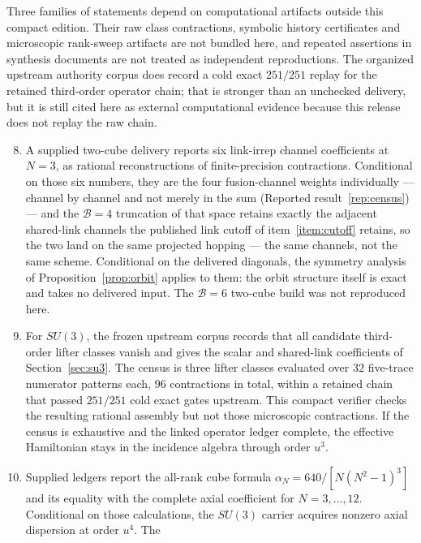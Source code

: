 \documentclass[11pt]{article}
\theoremstyle{plain}
\theoremstyle{definition}
\theoremstyle{remark}
\begin{document}
Three families of statements depend on computational artifacts outside this
compact edition. Their raw class contractions, symbolic history certificates
and microscopic rank-sweep artifacts are not bundled here, and repeated
assertions in synthesis documents are not treated as independent
reproductions. The organized upstream authority corpus does record a cold exact
$251/251$ replay for the retained third-order operator chain; that is stronger
than an unchecked delivery, but it is still cited here as external
computational evidence because this release does not replay the raw chain.

\begin{enumerate}\setcounter{enumi}{7}\itemsep2pt
\item A supplied two-cube delivery reports six link-irrep channel
  coefficients at $N=3$, as rational reconstructions of finite-precision
  contractions. Conditional on those six numbers, they are the four
  fusion-channel weights individually --- channel by channel and not merely in
  the sum (Reported result~\ref{rep:census}) --- and the $\mathcal B=4$ truncation of
  that space retains exactly the adjacent shared-link channels the published
  link cutoff of item~\ref{item:cutoff} retains, so the two land on the same
  projected hopping --- the same channels, not the same scheme. Conditional on the delivered diagonals, the symmetry
  analysis of Proposition~\ref{prop:orbit} applies to them: the orbit structure
  itself is exact and takes no delivered input.
  The $\mathcal B=6$ two-cube build was not reproduced here.
\item\label{item:domino} For $SU(3)$, the frozen upstream corpus records that
  all candidate third-order lifter classes vanish and gives the scalar and
  shared-link coefficients of Section~\ref{sec:su3}. The census is three
  lifter classes evaluated over $32$ five-trace numerator patterns each, $96$
  contractions in total, within a retained chain that passed $251/251$ cold
  exact gates upstream. This compact verifier checks the resulting rational
  assembly but not those microscopic contractions. If the census is exhaustive
  and the linked operator ledger complete, the effective Hamiltonian stays in
  the incidence algebra through order $u^3$.
\item Supplied ledgers report the all-rank cube formula
  $\alpha_N=640/[N(N^2-1)^3]$ and its equality with the complete axial
  coefficient for $N=3,\dots,12$. Conditional on those calculations, the
  $SU(3)$ carrier acquires nonzero axial dispersion at order $u^4$. The

\end{enumerate}
\end{document}
